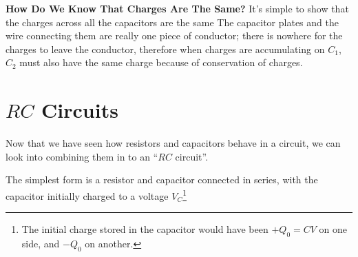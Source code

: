 \textbf{How Do We Know That Charges Are The Same?} It's simple to show that the
charges across all the capacitors are the same
The capacitor plates and the wire connecting them are really one piece of
conductor; there is nowhere for the charges to leave the conductor, therefore
when charges are accumulating on $C_1$, $C_2$ must also have the same charge
because of conservation of charges.



\section{$RC$ Circuits}
%
Now that we have seen how resistors and capacitors behave in a circuit, we can
look into combining them in to an ``$RC$ circuit''.

The simplest form is a resistor and capacitor connected in series, with the
capacitor initially charged to a voltage $V_C$\footnote{The initial charge
stored in the capacitor would have been $+Q_0=CV$ on one side, and $-Q_0$ on
another.}
%
%
%
%

